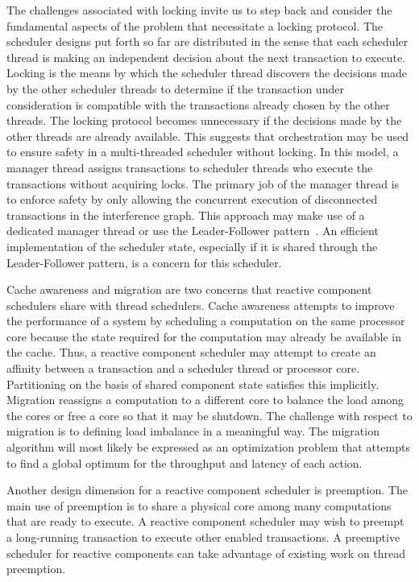 The challenges associated with locking invite us to step back and consider the fundamental aspects of the problem that necessitate a locking protocol.
The scheduler designs put forth so far are distributed in the sense that each scheduler thread is making an independent decision about the next transaction to execute.
Locking is the means by which the scheduler thread discovers the decisions made by the other scheduler threads to determine if the transaction under consideration is compatible with the transactions already chosen by the other threads.
The locking protocol becomes unnecessary if the decisions made by the other threads are already available.
This suggests that orchestration may be used to ensure safety in a multi-threaded scheduler without locking.
In this model, a manager thread assigns transactions to scheduler threads who execute the transactions without acquiring locks.
The primary job of the manager thread is to enforce safety by only allowing the concurrent execution of disconnected transactions in the interference graph.
This approach may make use of a dedicated manager thread or use the Leader-Follower pattern~\cite{schmidt2000pattern}.
An efficient implementation of the scheduler state, especially if it is shared through the Leader-Follower pattern, is a concern for this scheduler.

Cache awareness and migration are two concerns that reactive component schedulers share with thread schedulers.
Cache awareness attempts to improve the performance of a system by scheduling a computation on the same processor core because the state required for the computation may already be available in the cache.
Thus, a reactive component scheduler may attempt to create an affinity between a transaction and a scheduler thread or processor core.
Partitioning on the basis of shared component state satisfies this implicitly.
Migration reassigns a computation to a different core to balance the load among the cores or free a core so that it may be shutdown.
The challenge with respect to migration is to defining load imbalance in a meaningful way.
The migration algorithm will most likely be expressed as an optimization problem that attempts to find a global optimum for the throughput and latency of each action.

Another design dimension for a reactive component scheduler is preemption.
The main use of preemption is to share a physical core among many computations that are ready to execute.
A reactive component scheduler may wish to preempt a long-running transaction to execute other enabled transactions.
A preemptive scheduler for reactive components can take advantage of existing work on thread preemption.

